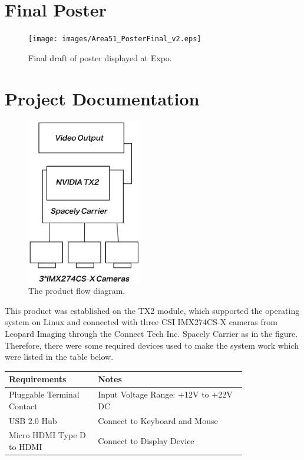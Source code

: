 \documentclass[letterpaper,10pt,serif,draftclsnofoot,onecolumn,compsoc,titlepage]{IEEEtran}
\begin{document}
		

	\newpage

\section{Final Poster}

	\begin{figure}[H]
		\centering
		\label{fig:ExpoPosterFinal_v2}
		\texttt{[image: images/Area51\_PosterFinal\_v2.eps]}
		\caption{Final draft of poster displayed at Expo. \label{overflow}}
	\end{figure}

\newpage

\section{Project Documentation}
\begin{figure}[H]
  \centering
  \label{fig: The product flow diagram.}
  \includegraphics[width=5cm]{images/diagram2.eps}
  \caption{The product flow diagram. \label{overflow}}
\end{figure}

This product was established on the TX2 module, which supported the operating system on Linux and 
connected with three CSI IMX274CS-X cameras from Leopard Imaging through the Connect Tech Inc. 
Spacely Carrier as in the figure. Therefore, there were some required devices used to make the 
system work which were listed in the table below. \\

\begin{tabular}{|p{0.3\linewidth}|p{0.5\linewidth}|}
   \hline
   \textbf{Requirements} & \textbf{Notes} \\ 
   \hline
	Pluggable Terminal Contact & Input Voltage Range: +12V to +22V DC \\
   \hline
   USB 2.0 Hub & Connect to Keyboard and Mouse \\
   \hline
   Micro HDMI Type D to HDMI & Connect to Display Device \\
   \hline
\end{tabular}
\end{document}
